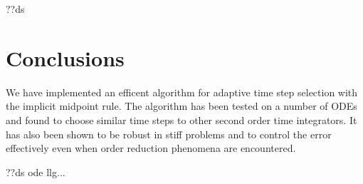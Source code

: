 ??ds



\section{Conclusions}

We have implemented an efficent algorithm for adaptive time step selection with the implicit midpoint rule.
The algorithm has been tested on a number of ODEs and found to choose similar time steps to other second order time integrators.
It has also been shown to be robust in stiff problems and to control the error effectively even when order reduction phenomena are encountered.

??ds ode llg...


